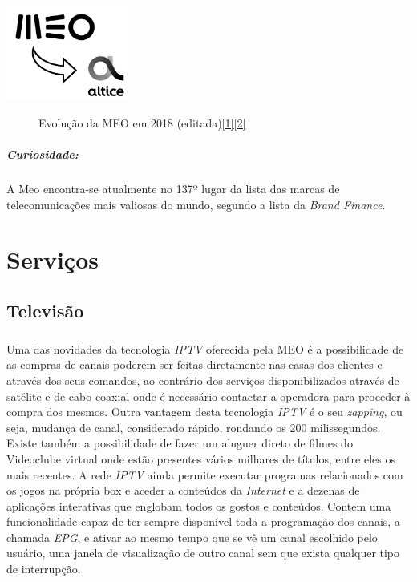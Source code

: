 \documentclass{report}
\begin{document}
\begin{center}
\includegraphics[width=4cm]{MEO-Altice.pdf} 
\begin{figure}[h]
\caption{Evolução da MEO em 2018 (editada)\href{https://pplware.sapo.pt/wp-content/uploads/2017/07/MEO-1-720x296.jpg}{[1]}\href{http://altice.net/sites/default/files/brand/altice_logo_pos_pr_rgb.jpg}{[2]}}
\end{figure}
\end{center}

\paragraph{Curiosidade:}

\paragraph{}A Meo encontra-se atualmente no 137º lugar da lista das marcas de telecomunicações mais valiosas do mundo, segundo a lista da \textit{Brand Finance}.

\chapter{Serviços}
\label{chap.serviços}

\section{Televisão}

\paragraph{}Uma das novidades da tecnologia \textit{IPTV} oferecida pela MEO é a possibilidade de as compras de canais poderem ser feitas diretamente nas casas dos clientes e através dos seus comandos, ao contrário dos serviços disponibilizados através de satélite e de cabo coaxial onde é necessário contactar a operadora para proceder à compra dos mesmos. Outra vantagem desta tecnologia \textit{IPTV} é o seu \textit{zapping}, ou seja, mudança de canal, considerado rápido, rondando os 200 milissegundos. Existe também a possibilidade de fazer um aluguer direto de filmes do Videoclube virtual onde estão presentes vários milhares de títulos, entre eles os mais recentes. A rede \textit{IPTV} ainda permite executar programas relacionados com os jogos na própria box e aceder a conteúdos da \textit{Internet} e a dezenas de aplicações interativas que englobam todos os gostos e conteúdos. Contem uma funcionalidade capaz de ter sempre disponível toda a programação dos canais, a chamada \textit{EPG}, e ativar ao mesmo tempo que se vê um canal escolhido pelo usuário, uma janela de visualização de outro canal sem que exista qualquer tipo de interrupção.
\end{document}
